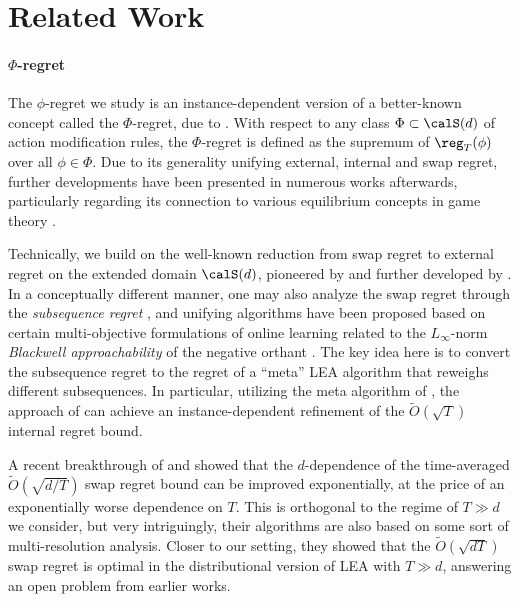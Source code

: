 \section{Related Work}
\paragraph{$\Phi$-regret} The $\phi$-regret we study is an instance-dependent version of a better-known concept called the $\Phi$-regret, due to \cite{greenwald2003general}. With respect to any class $\Phi\subset\calS(d)$ of action modification rules, the $\Phi$-regret is defined as the supremum of $\reg_T(\phi)$ over all $\phi\in\Phi$. Due to its generality unifying external, internal and swap regret, further developments have been presented in numerous works afterwards, particularly regarding its connection to various equilibrium concepts in game theory \citep{stoltz2007learning,rakhlin2011online,piliouras2022evolutionary,bernasconi2023constrained,cai2024tractable,zhang2024efficient}. 

Technically, we build on the well-known reduction from swap regret to external regret on the extended domain $\calS(d)$, pioneered by \cite{stoltz2005internal,blum2007external,gordon2008no} and further developed by \cite{ito2020tight}. In a conceptually different manner, one may also analyze the swap regret through the \emph{subsequence regret} \citep{lehrer2003wide,roth2023learning}, and unifying algorithms have been proposed based on certain multi-objective formulations of online learning \citep{lee2022online,haghtalab2023calibrated,noarov2023high} related to the $L_\infty$-norm \emph{Blackwell approachability} of the negative orthant \citep{blackwell1956analog,perchet2015exponential,shimkin2016online}. The key idea here is to convert the subsequence regret to the regret of a ``meta'' LEA algorithm that reweighs different subsequences. In particular, utilizing the meta algorithm of \cite{chen2021impossible}, the approach of \cite{roth2023learning} can achieve an instance-dependent refinement of the $\tilde O(\sqrt{T})$ internal regret bound.

A recent breakthrough of \cite{dagan2024external} and \cite{peng2024fast} showed that the $d$-dependence of the time-averaged $\tilde O(\sqrt{d/T})$ swap regret bound can be improved exponentially, at the price of an exponentially worse dependence on $T$. This is orthogonal to the regime of $T\gg d$ we consider, but very intriguingly, their algorithms are also based on some sort of multi-resolution analysis. Closer to our setting, they showed that the $\tilde O(\sqrt{dT})$ swap regret is optimal in the distributional version of LEA with $T\gg d$, answering an open problem from earlier works. 

